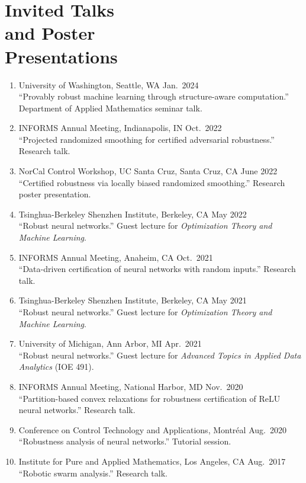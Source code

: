 \documentclass[11pt]{article}
\newcommand{\cvdate}[1]{\hfill#1}			%
\begin{document}
	\section{\texorpdfstring{Invited Talks \\[\baselineskip] and Poster \\ Presentations}{Invited Talks and Poster Presentations}}
	\hfill\vspace*{-3\baselineskip}
	\begin{enumerate}[label={\arabic*.}]
		\item University of Washington, Seattle, WA \cvdate{Jan.\ 2024}\\
		``Provably robust machine learning through structure-aware computation.'' Department of Applied Mathematics seminar talk.
		\item INFORMS Annual Meeting, Indianapolis, IN \cvdate{Oct.\ 2022}\\
		``Projected randomized smoothing for certified adversarial robustness.'' Research talk.
		\item NorCal Control Workshop, UC Santa Cruz, Santa Cruz, CA \cvdate{June 2022}\\
		``Certified robustness via locally biased randomized smoothing.'' Research poster presentation.
		\item Tsinghua-Berkeley Shenzhen Institute, Berkeley, CA \cvdate{May 2022}\\
		``Robust neural networks.'' Guest lecture for \textit{Optimization Theory and Machine Learning}.
		\item INFORMS Annual Meeting, Anaheim, CA \cvdate{Oct.\ 2021}\\
		``Data-driven certification of neural networks with random inputs.'' Research talk.
		\item Tsinghua-Berkeley Shenzhen Institute, Berkeley, CA \cvdate{May 2021}\\
		``Robust neural networks.'' Guest lecture for \textit{Optimization Theory and Machine Learning}.
		\item University of Michigan, Ann Arbor, MI \cvdate{Apr.\ 2021}\\
		``Robust neural networks.'' Guest lecture for \textit{Advanced Topics in Applied Data Analytics} (IOE 491).
		\item INFORMS Annual Meeting, National Harbor, MD \cvdate{Nov.\ 2020}\\
		``Partition-based convex relaxations for robustness certification of ReLU neural networks.'' Research talk.
		\item Conference on Control Technology and Applications, Montr\'eal \cvdate{Aug.\ 2020}\\
		``Robustness analysis of neural networks.'' Tutorial session.
		\item Institute for Pure and Applied Mathematics, Los Angeles, CA \cvdate{Aug.\ 2017}\\
		``Robotic swarm analysis.'' Research talk.
	\end{enumerate}
	
\end{document}
